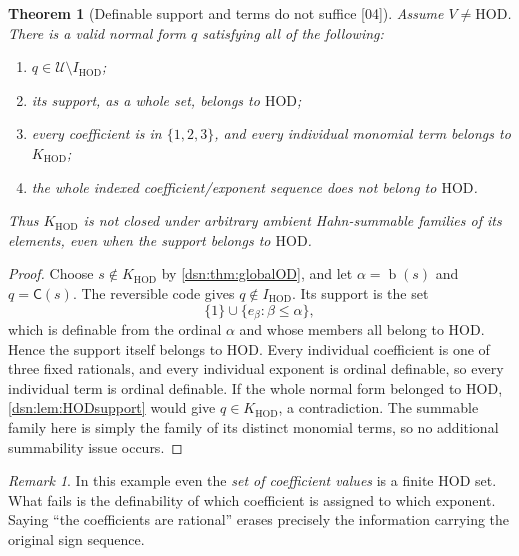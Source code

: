 \documentclass[11pt,a4paper]{article}
\numberwithin{equation}{section}
\newtheorem{theorem}{Theorem}[section]
\theoremstyle{definition}
\theoremstyle{remark}
\newtheorem{remark}[remark]{Remark}
\newcommand{\HOD}{\mathrm{HOD}}
\newcommand{\bd}{\operatorname{b}}
\newcommand{\Code}{\mathsf C}
\newcommand{\Cell}{\mathcal U}
\newcommand{\KH}{K_{\HOD}}
\newcommand{\IH}{I_{\HOD}}
\newcommand{\src}[1]{\textup{\textsf{\small[#1]}}}
\begin{document}
\begin{theorem}[Definable support and terms do not suffice \src{04}]
\label{dsn:thm:termwise}
Assume $V\ne\HOD$. There is a valid normal form $q$ satisfying all
of the following:
\begin{enumerate}[label=\textup{(\roman*)}]
\item $q\in\Cell\setminus\IH$;
\item its support, as a whole set, belongs to $\HOD$;
\item every coefficient is in $\{1,2,3\}$, and every individual
monomial term belongs to $\KH$;
\item the whole indexed coefficient/exponent sequence does not
belong to $\HOD$.
\end{enumerate}
Thus $\KH$ is not closed under arbitrary ambient Hahn-summable
families of its elements, even when the support belongs to $\HOD$.
\end{theorem}
\begin{proof}
Choose $s\notin\KH$ by \cref{dsn:thm:globalOD}, and let
$\alpha=\bd(s)$ and $q=\Code(s)$. The reversible code gives
$q\notin\IH$. Its support is the set
\[
 \{1\}\cup\{e_\beta:\beta\leq\alpha\},
\]
which is definable from the ordinal $\alpha$ and whose members all
belong to $\HOD$. Hence the support itself belongs to $\HOD$. Every
individual coefficient is one of three fixed rationals, and every
individual exponent is ordinal definable, so every individual term
is ordinal definable. If the whole normal form belonged to $\HOD$,
\cref{dsn:lem:HODsupport} would give $q\in\KH$, a contradiction.
The summable family here is simply the family of its distinct
monomial terms, so no additional summability issue occurs.
\end{proof}

\begin{remark}
In this example even the \emph{set of coefficient values} is a
finite $\HOD$ set. What fails is the definability of which coefficient
is assigned to which exponent. Saying ``the coefficients are
rational'' erases precisely the information carrying the original
sign sequence.
\end{remark}
\end{document}
